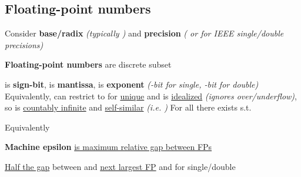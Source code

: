 \subsection*{Floating-point numbers}

Consider \textbf{base/radix}  \emph{(typically
      )} and \textbf{precision}  \emph{(
      or  for IEEE single/double precisions)}

\textbf{Floating-point numbers} are discrete subset
\begin{itemize}

      \vItem
             is \textbf{sign-bit},  is
            \textbf{mantissa},  is \textbf{exponent}
            \emph{(-bit for single, -bit for double)}
      \vItem
            Equivalently, can restrict to
             for \underline{unique}  and
      \vItem
             is \underline{idealized} 
            \emph{(ignores over/underflow)}, so is \underline{countably infinite} and \underline{self-similar}
            \emph{(i.e. )}
      \vItem
            For all  there exists  s.t.

            \begin{itemize}
                  \vItem
                        Equivalently
            \end{itemize}
\end{itemize}

\textbf{Machine epsilon}
\underline{is maximum relative gap between FPs}
\begin{itemize}
      \vItem
            \underline{Half the gap} between  and \underline{next largest FP}
      \vItem
             and
             for single/double
\end{itemize}

